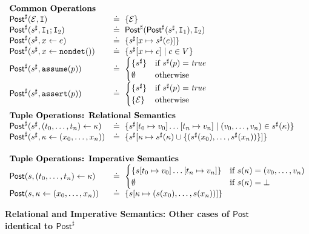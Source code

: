 \documentclass[nocopyrightspace]{sigplanconf}
\newcommand{\figbegin}{}
\newcommand{\figend}{}
\newcommand{\defeq}{\doteq\ }
\def\set#1{{\{ #1\}}}
\def\true{{\it true}}
\newcommand{\UPD}[3]{{#1}[{#2} \mapsto {#3}]}
\newcommand{\ASSERT}[2]{\{{#1}\}\ {#2}}
\newcommand{\ERROR}{\mathit{Error}}
\newcommand{\kvar}{\kappa}
\def\NONDET{\mathtt{nondet}}
\newcommand{\istate}{s}
\newcommand{\rstate}{\istate^{\sharp}}
\newcommand{\ASSIGN}[2]{{#1} \leftarrow {#2}}
\newcommand{\TASSIGN}[2]{{#1} \leftarrow {#2}}
\newcommand{\HAVOC}[1]{\ASSIGN{#1}{\NONDET()}}
\def\ASSUME{{{\mathtt{assume}}}}
\def\ASSERT{{{\mathtt{assert}}}}
\newcommand{\GET}[2]{\TASSIGN{#2}{#1}}
\newcommand{\SET}[2]{\TASSIGN{#1}{#2}}
\def\vals{V}
\def\instr{\mathtt{I}}
\def\rkvar{{\kvar}}
\def\RELSEM{{Relational}\xspace}
\def\IMPSEM{{Imperative}\xspace}
\def\ERROR{{\mathcal{E}}}
\def\rpost{\mathsf{Post}^{\sharp}}
\def\ipost{\mathsf{Post}}
\begin{document}
\begin{figure*}[t]
\begin{small}
\figbegin
$$\begin{array}{ll}
\multicolumn{2}{l}{\textbf{Common Operations}}\\
\rpost(\ERROR, \instr) 	& \defeq  \set{\ERROR} \\ 
\rpost(\rstate,\instr_1;\instr_2) & \defeq  \rpost(\rpost(\rstate, \instr_1), \instr_2) \\ 
\rpost(\rstate,\ASSIGN{x}{e})  & \defeq  \set{\UPD{\rstate}{x}{\rstate(e)}} \\
\rpost(\rstate,\HAVOC{x}) 	& \defeq  \set{\UPD{\rstate}{x}{c} \mid c \in \vals}\\
\rpost(\rstate,\ASSUME(p)) 	& \defeq  \begin{cases} 
					    	\set{\rstate}   & \mbox{if }\rstate(p) = \true\\
                                       		\emptyset & \mbox{otherwise}
                          	   	  \end{cases}\\
\rpost(\rstate,\ASSERT(p)) 	& \defeq  \begin{cases} 
						\set{\rstate}   & \mbox{if } \rstate(p) = \true\\
                                        	\set{\ERROR} & \mbox{otherwise}
                          	   	  \end{cases}\\[0.2in]
\multicolumn{2}{l}{\textbf{Tuple Operations: \RELSEM Semantics}}\\
\rpost(\rstate,\GET{\rkvar}{(t_0,\ldots,t_n)}) & \defeq
\{\UPD{\rstate}{t_0}{v_0}\ldots\UPD{}{t_n}{v_n} \mid (v_0,\ldots,v_n) \in \rstate(\rkvar)\}\\
\rpost(\rstate,\SET{\rkvar}{(x_0,\ldots,x_n)}) & \defeq 
\set{\UPD{\rstate}{\rkvar}{\rstate(\rkvar) \cup \set{(\rstate(x_0),\ldots,\rstate(x_n))}}}\\[0.2in]
\multicolumn{2}{l}{\textbf{Tuple Operations: \IMPSEM Semantics}}\\
\ipost(\istate,\GET{\rkvar}{(t_0,\ldots,t_n)})	
& \defeq \begin{cases}
	 \set{\UPD{\istate}{t_0}{v_0}\ldots\UPD{}{t_n}{v_n}} & \mbox{if } \istate(\rkvar) = (v_0,\ldots,v_n) \\
	 \emptyset & \mbox{if } \istate(\rkvar) = \bot \\
\end{cases} \\			
\ipost(\istate, \SET{\rkvar}{(x_0,\ldots,x_n)}) & \defeq \set{\UPD{\istate}{\rkvar}{(\istate(x_0),\ldots,\istate(x_n))}}
\end{array}$$
\figend
\end{small}
\caption{\textbf{\RELSEM and \IMPSEM Semantics: Other cases of $\ipost$
identical to $\rpost$}}
\label{fig:impsemantics}
\label{fig:relsemantics}
\end{figure*}
\end{document}
